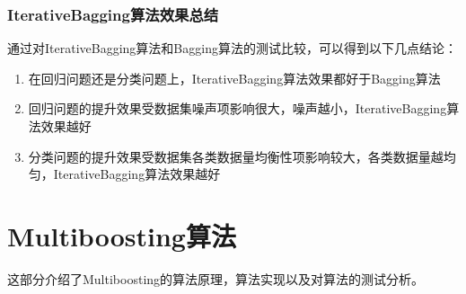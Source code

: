 \documentclass[a4paper,oneside,12pt]{article}
\begin{document}
\begin{spacing}{1.5}
\subsubsection{IterativeBagging算法效果总结}
通过对IterativeBagging算法和Bagging算法的测试比较，可以得到以下几点结论：
\begin{enumerate}
\item 在回归问题还是分类问题上，IterativeBagging算法效果都好于Bagging算法
\item 回归问题的提升效果受数据集噪声项影响很大，噪声越小，IterativeBagging算法效果越好
\item 分类问题的提升效果受数据集各类数据量均衡性项影响较大，各类数据量越均匀，IterativeBagging算法效果越好
\end{enumerate}

\newpage

\section{Multiboosting算法\cite{Webb:2000:MTC:350128.350132}}
这部分介绍了Multiboosting的算法原理，算法实现以及对算法的测试分析。

\end{spacing}
\end{document}
